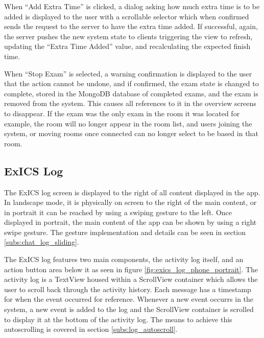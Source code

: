 When ``Add Extra Time'' is clicked, a dialog asking how much extra time is to be added is displayed to the user with a scrollable selector which when confirmed sends the request to the server to have the extra time added.  If successful, again, the server pushes the new system state to clients triggering the view to refresh, updating the ``Extra Time Added'' value, and recalculating the expected finish time.

When ``Stop Exam'' is selected, a warning confirmation is displayed to the user that the action cannot be undone, and if confirmed, the exam state is changed to complete, stored in the MongoDB database of completed exams, and the exam is removed from the system.  This causes all references to it in the overview screens to disappear.  If the exam was the only exam in the room it was located for example, the room will no longer appear in the room list, and users joining the system, or moving rooms once connected can no longer select to be based in that room.

\subsection{ExICS Log}
\label{subs:exics_log_expl}

The ExICS log screen is displayed to the right of all content displayed in the app.  In landscape mode, it is physically on screen to the right of the main content, or in portrait it can be reached by using a swiping gesture to the left.  Once displayed in portrait, the main content of the app can be shown by using a right swipe gesture.  The gesture implementation and details can be seen in section \ref{subs:chat_log_sliding}.

The ExICS log features two main components, the activity log itself, and an action button area below it as seen in figure \ref{fig:exics_log_phone_portrait}.  The activity log is a TextView housed within a ScrollView container which allows the user to scroll back through the activity history.  Each message has a timestamp for when the event occurred for reference.  Whenever a new event occurrs in the system, a new event is added to the log and the ScrollView container is scrolled to display it at the bottom of the activity log.  The means to achieve this autoscrolling is covered in section \ref{subs:log_autoscroll}.

\FloatBarrier


